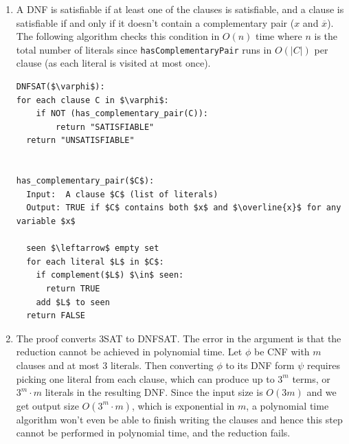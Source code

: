\documentclass[12pt]{article}
\begin{document}
\begin{solution}
    \bbni

    \begin{enumerate}
        \item [(a)] A DNF is satisfiable if at least one of the clauses is satisfiable, and a clause is satisfiable if and only if it doesn't contain a complementary pair ($x$ and $\overline{x}$). The following algorithm checks this condition in $O(n)$ time where $n$ is the total number of literals since \texttt{hasComplementaryPair} runs in $O(|C|)$ per clause (as each literal is visited at most once).
        \begin{lstlisting}[mathescape]
DNFSAT($\varphi$):
for each clause C in $\varphi$:
    if NOT (has_complementary_pair(C)):
        return "SATISFIABLE"
  return "UNSATISFIABLE"


has_complementary_pair($C$):
  Input:  A clause $C$ (list of literals)
  Output: TRUE if $C$ contains both $x$ and $\overline{x}$ for any variable $x$

  seen $\leftarrow$ empty set
  for each literal $L$ in $C$:
    if complement($L$) $\in$ seen:
      return TRUE
    add $L$ to seen
  return FALSE
        \end{lstlisting}
        \item [(b)] The proof converts \textsc{3SAT} to \textsc{DNFSAT}. The error in the argument is that the reduction cannot be achieved in polynomial time.  Let $\phi$ be CNF with $m$ clauses and at most $3$ literals. Then converting $\phi$ to its DNF form $\psi$ requires picking one literal from each clause, which can produce up to $3^m$ terms, or $3^m \cdot m$ literals in the resulting DNF. Since the input size is $O(3m)$ and we get output size $O(3^m \cdot m)$, which is exponential in $m$, a polynomial time algorithm won't even be able to finish writing the clauses and hence this step cannot be performed in polynomial time, and the reduction fails.
    \end{enumerate}
\end{solution}


\newpage 
\end{document}
